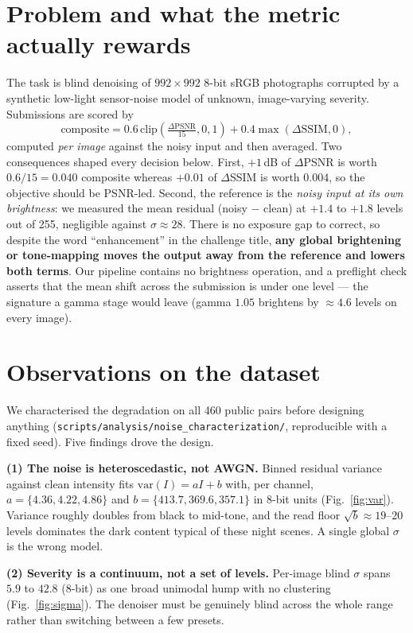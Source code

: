 \section{Problem and what the metric actually rewards}

The task is blind denoising of $992\times992$ 8-bit sRGB photographs corrupted by a
synthetic low-light sensor-noise model of unknown, image-varying severity. Submissions
are scored by
\[
\text{composite}=0.6\,\mathrm{clip}\!\left(\tfrac{\Delta \text{PSNR}}{15},0,1\right)+0.4\max(\Delta \text{SSIM},0),
\]
computed \emph{per image} against the noisy input and then averaged. Two consequences
shaped every decision below. First, $+1$\,dB of $\Delta$PSNR is worth $0.6/15=0.040$
composite whereas $+0.01$ of $\Delta$SSIM is worth $0.004$, so the objective should be
PSNR-led. Second, the reference is the \emph{noisy input at its own brightness}: we
measured the mean residual (noisy $-$ clean) at $+1.4$ to $+1.8$ levels out of 255,
negligible against $\sigma\!\approx\!28$. There is no exposure gap to correct, so
despite the word ``enhancement'' in the challenge title, \textbf{any global brightening
or tone-mapping moves the output away from the reference and lowers both terms}. Our
pipeline contains no brightness operation, and a preflight check asserts that the mean
shift across the submission is under one level --- the signature a gamma stage would
leave (gamma $1.05$ brightens by $\approx4.6$ levels on every image).

\section{Observations on the dataset}

We characterised the degradation on all 460 public pairs before designing anything
(\texttt{scripts/analysis/noise\_characterization/}, reproducible with a fixed seed). Five
findings drove the design.

\textbf{(1) The noise is heteroscedastic, not AWGN.} Binned residual variance against
clean intensity fits $\mathrm{var}(I)=aI+b$ with, per channel,
$a=\{4.36,4.22,4.86\}$ and $b=\{413.7,369.6,357.1\}$ in 8-bit units
(Fig.~\ref{fig:var}). Variance roughly doubles from black to mid-tone, and the read
floor $\sqrt{b}\approx19$--$20$ levels dominates the dark content typical of these
night scenes. A single global $\sigma$ is the wrong model.

\textbf{(2) Severity is a continuum, not a set of levels.} Per-image blind $\sigma$
spans $5.9$ to $42.8$ (8-bit) as one broad unimodal hump with no clustering
(Fig.~\ref{fig:sigma}). The denoiser must be genuinely blind across the whole range
rather than switching between a few presets.

